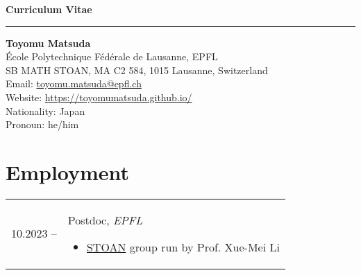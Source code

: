 \documentclass[12pt]{article}
\title{ }
\author{}
\date{}
\begin{document}
\begin{center}
    \textbf{{\Large Curriculum Vitae}} 
\end{center}
\hrule
\vspace{3ex}
\textbf{Toyomu Matsuda} \\

\noindent École Polytechnique Fédérale de Lausanne, EPFL \\
SB MATH STOAN, MA C2 584, 1015 Lausanne, Switzerland \\

\vspace{-1ex}
\noindent Email: \href{mailto:toyomu.matsuda@epfl.ch}{toyomu.matsuda@epfl.ch} \\
Website: \url{https://toyomumatsuda.github.io/} \\
Nationality: Japan \\
Pronoun: he/him



\section{Employment}
\begin{tabular}{p{2.5cm} l}
    \rule{0pt}{0ex} 
    {10.2023 -- } & 
    \begin{minipage}[t]{0.7\textwidth}
    Postdoc, \emph{EPFL} 
    \begin{itemize}[leftmargin=*]
        \renewcommand\labelitemi{--}
        \setlength\itemsep{1ex}
        \setlength{\parskip}{0pt}
        \setlength{\parsep}{0pt}
        \setlength{\baselineskip}{0pt}
        \item  \href{https://www.epfl.ch/labs/stoan/}{STOAN} group run by Prof. Xue-Mei Li
    \end{itemize}
    \end{minipage}
\end{tabular}
\end{document}
